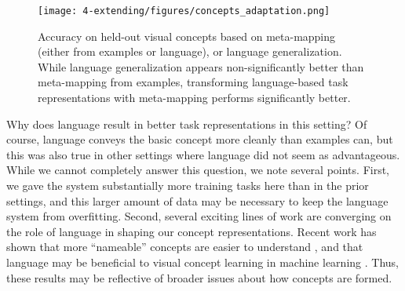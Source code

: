 \begin{figure}
\centering
\texttt{[image: 4-extending/figures/concepts\_adaptation.png]}
\caption[Accuracy on held-out visual concepts.]{Accuracy on held-out visual concepts based on meta-mapping (either from examples or language), or language generalization. While language generalization appears non-significantly better than meta-mapping from examples, transforming language-based task representations with meta-mapping performs significantly better.} \label{fig:extending_concepts_adaptation} 
\end{figure}

Why does language result in better task representations in this setting? Of course, language conveys the basic concept more cleanly than examples can, but this was also true in other settings where language did not seem as advantageous. While we cannot completely answer this question, we note several points. First, we gave the system substantially more training tasks here than in the prior settings, and this larger amount of data may be necessary to keep the language system from overfitting. Second, several exciting lines of work are converging on the role of language in shaping our concept representations. Recent work has shown that more ``nameable'' concepts are easier to understand \citep{Lupyan2020}, and that language may be beneficial to visual concept learning in machine learning \citep{Mu2019}. Thus, these results may be reflective of broader issues about how concepts are formed. \par

